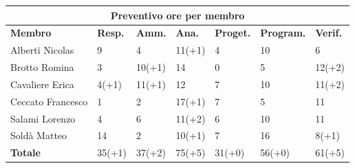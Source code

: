 \documentclass[a4paper, 12pt]{article}
\begin{document}
\begin{center}
	\begin{tabularx}{\textwidth}{|X|X|X|X|X|X|X|}
		\hline
		\multicolumn{7}{|c|}{\textbf{Preventivo ore per membro}}                                      \\
		\hline
		\hline
		\textbf{Membro}  & \textbf{Resp.} & \textbf{Amm.} & \textbf{Ana.} &
		\textbf{Proget.} & \textbf{Program.} & \textbf{Verif.} \\
		\hline
		Alberti Nicolas    	&9 	&4	&11(+1)	&4	&10 &6	\\
		\hline
		Brotto Romina    	&3 	&10(+1)	&14	&0	&5 &12(+2)	\\
		\hline
		Cavaliere Erica    	&4(+1) 	&11(+1)  &12  &7 &10 &11(+2)	\\
		\hline
		Ceccato Francesco   &1 	&2  &17(+1) &7 &5 &11	\\
		\hline
		Salami Lorenzo    	&4 	&6  &11(+2) &6 &10 &11	\\
		\hline
		Soldà Matteo    	&14	&2  &10(+1) &7 &16 &8(+1)	\\
		\hline
		\hline
		\textbf{Totale} 	&35(+1) &37(+2) &75(+5) &31(+0) &56(+0) &61(+5)	\\
		\hline
	\end{tabularx}\\[8pt]
	\mbox{}\\
\end{center}
\end{document}

